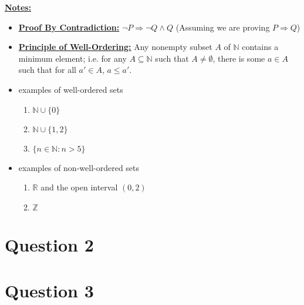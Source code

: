 \documentclass[12pt]{article}
\begin{document}
\bigskip

\underline{\textbf{Notes:}}

\begin{itemize}
    \item \underline{\textbf{Proof By Contradiction:}} $\neg P \Rightarrow \neg Q \land Q$ (Assuming
    we are proving $P \Rightarrow Q$)
    \item \underline{\textbf{Principle of Well-Ordering:}} Any nonempty subset $A$
    of $\mathbb{N}$ contains a minimum element; i.e. for any $A \subseteq \mathbb{N}$
    such that $A \neq \emptyset$, there is some $a \in A$ such that for all $a' \in A$, $a \leq a'$.

    \item examples of well-ordered sets
    \begin{enumerate}[1.]
        \item $\mathbb{N} \cup \{0\}$
        \item $\mathbb{N} \cup \{1,2\}$
        \item $\{n \in \mathbb{N}: n > 5\}$
    \end{enumerate}
    \item examples of non-well-ordered sets
    \begin{enumerate}[1.]
        \item $\mathbb{R}$ and the open interval $(0,2)$
        \item $\mathbb{Z}$
    \end{enumerate}
\end{itemize}

\section*{Question 2}

\section*{Question 3}
\end{document}
